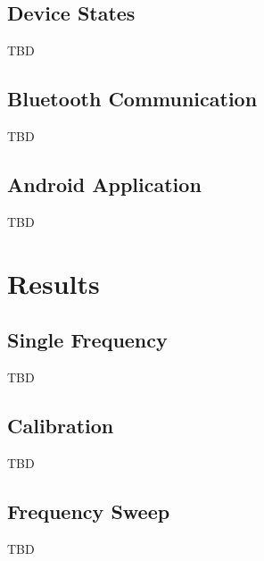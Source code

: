 \documentclass[]{IEEEtran}
\begin{document}
\subsection{Device States}
TBD
\subsection{Bluetooth Communication}
TBD
\subsection{Android Application}
TBD


\section{Results}
\subsection{Single Frequency}
TBD
\subsection{Calibration}
TBD
\subsection{Frequency Sweep}
TBD




%
%
\end{document}
